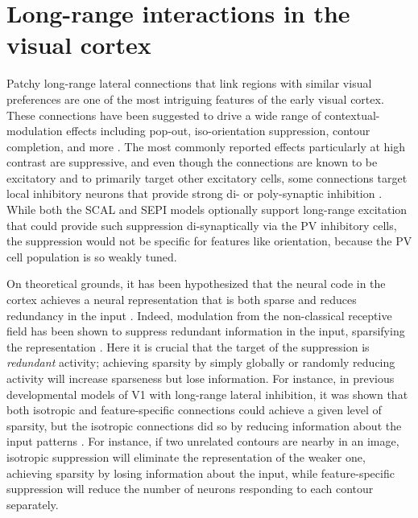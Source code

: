 \chapter{Long-range interactions in the visual cortex}

Patchy long-range lateral connections that link regions with similar
visual preferences are one of the most intriguing features of the
early visual cortex. These connections have been suggested to drive a
wide range of contextual-modulation effects including pop-out,
iso-orientation suppression, contour completion, and more
\citep{Gilbert1983, Hirsch1991, McGuire1991, Grinvald1994,
  Fitzpatrick2000, Hupe2001, Stettler2002}. The most commonly reported
effects particularly at high contrast are suppressive, and even though
the connections are known to be excitatory and to primarily target
other excitatory cells, some connections target local inhibitory
neurons that provide strong di- or poly-synaptic inhibition
\citep{Hirsch1991,Weliky1995}.  While both the SCAL and SEPI models
optionally support long-range excitation that could provide such
suppression di-synaptically via the PV inhibitory cells, the
suppression would not be specific for features like orientation,
because the PV cell population is so weakly tuned.

On theoretical grounds, it has been hypothesized that the neural code
in the cortex achieves a neural representation that is both sparse and
reduces redundancy in the input
\citep{barlow:comneuron89,Olshausen1996}. Indeed, modulation from the
non-classical receptive field has been shown to suppress redundant
information in the input, sparsifying the representation
\citep{Vinje2000}. Here it is crucial that the target of the
suppression is \emph{redundant} activity; achieving sparsity by simply
globally or randomly reducing activity will increase sparseness but
lose information. For instance, in previous developmental models of V1
with long-range lateral inhibition, it was shown that both isotropic
and feature-specific connections could achieve a given level of
sparsity, but the isotropic connections did so by reducing information
about the input patterns \citep{Miikkulainen2005}.  For instance, if
two unrelated contours are nearby in an image, isotropic suppression
will eliminate the representation of the weaker one, achieving
sparsity by losing information about the input, while feature-specific
suppression will reduce the number of neurons responding to each
contour separately.

